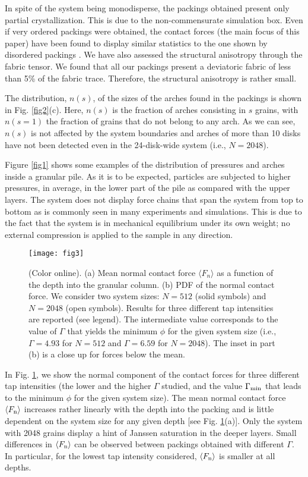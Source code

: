 In spite of the system being monodisperse, the packings obtained present only partial crystallization. This is due to the non-commensurate simulation box. Even if very ordered packings were obtained, the contact forces (the main focus of this paper) have been found to display similar statistics to the one shown by disordered packings \cite{blair}. We have also assessed the structural anisotropy through the fabric tensor. We found that all our packings present a deviatoric fabric of less than 5\% of the fabric trace. Therefore, the structural anisotropy is rather small.

The distribution, $n(s)$, of the sizes of the arches found in the packings is shown in Fig. \ref{fig2}(c). Here, $n(s)$ is the fraction of arches consisting in $s$ grains, with $n(s=1)$ the fraction of grains that do not belong to any arch. As we can see, $n(s)$ is not affected by the system boundaries and arches of more than 10 disks have not been detected even in the 24-disk-wide system (i.e., $N=2048$).

Figure \ref{fig1} shows some examples of the distribution of pressures and arches inside a granular pile. As it is to be expected, particles are subjected to higher pressures, in average, in the lower part of the pile as compared with the upper layers. The system does not display force chains that span the system from top to bottom as is commonly seen in many experiments and simulations. This is due to the fact that the system is in mechanical equilibrium under its own weight; no external compression is applied to the sample in any direction.


\begin{figure}[b]
\centering
\texttt{[image: fig3]}
\caption {(Color online). (a) Mean normal contact force $\langle F_n \rangle$ as a function of the depth into the granular column.  (b) PDF of the normal contact force. We consider two system sizes: $N=512$ (solid symbols) and $N=2048$ (open symbols). Results for three different tap intensities are reported (see legend). The intermediate value corresponds to the value of $\Gamma$ that yields the minimum $\phi$ for the given system size (i.e., $\Gamma=4.93$ for $N=512$ and $\Gamma=6.59$ for $N=2048$). The inset in part (b) is a close up for forces below the mean.}
\label{fig3}
\end{figure}

In Fig. \ref{fig3}, we show the normal component of the contact forces for three different tap intensities (the lower and the higher $\Gamma$ studied, and the value $\Gamma_{\rm{min}}$ that leads to the minimum $\phi$ for the given system size). The mean normal contact force $\langle F_{\rm{n}} \rangle$ increases rather linearly with the depth into the packing and is little dependent on the system size for any given depth [see Fig. \ref{fig3}(a)]. Only the system with 2048 grains display a hint of Janssen saturation in the deeper layers. Small differences in $\langle F_{\rm{n}} \rangle$ can be observed between packings obtained with different $\Gamma$. In particular, for the lowest tap intensity considered,  $\langle F_{\rm{n}} \rangle$ is smaller at all depths.

